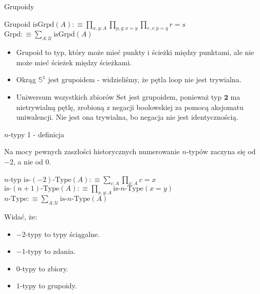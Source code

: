 \documentclass{beamer}
\newcommand{\defn}{:\equiv}
\newcommand{\U}{\mathcal{U}}
\newcommand{\isGrpd}{\text{isGrpd}}
\newcommand{\Set}{\text{Set}}
\newcommand{\Grpd}{\text{Grpd}}
\newcommand{\hS}{\mathbb{S}^1}
\newcommand{\looop}{\text{loop}}
\begin{document}
\begin{frame}{Grupoidy}

\begin{block}{Grupoid}
$\isGrpd(A) \defn \prod_{x, y : A} \prod_{p, q : x = y} \prod_{r, s : p = q} r = s$ \\
$\Grpd \defn \sum_{A : \U} \isGrpd(A)$
\end{block}

\begin{itemize}
	\item Grupoid to typ, który może mieć punkty i ścieżki między punktami, ale nie może mieć ścieżek między ścieżkami.
	\item Okrąg $\hS$ jest grupoidem - widzieliśmy, że pętla $\looop$ nie jest trywialna.
	\item Uniwersum wszystkich zbiorów $\Set$ jest grupoidem, ponieważ typ $\textbf{2}$ ma nietrywialną pętlę, zrobioną z negacji boolowskiej za pomocą aksjomatu uniwalencji. Nie jest ona trywialna, bo negacja nie jest identycznością.
\end{itemize}

\end{frame}

\begin{frame}{$n$-typy 1 - definicja}

Na mocy pewnych zaszłości historycznych numerowanie $n$-typów zaczyna się od $-2$, a nie od $0$.

\begin{block}{$n$-typ}
$\text{is-}(-2)\text{-Type}(A) \defn \sum_{c : A} \prod_{x : A} c = x$ \\
$\text{is-}(n + 1)\text{-Type}(A) \defn \prod_{x, y : A} \text{is-}n\text{-Type}(x = y)$ \\
$n\text{-Type} \defn \sum_{A : \U} \text{is-}n\text{-Type}(A)$
\end{block}

Widać, że:
\begin{itemize}
	\item $-2$-typy to typy ściągalne.
	\item $-1$-typy to zdania.
	\item $0$-typy to zbiory.
	\item $1$-typy to grupoidy.
\end{itemize}

\end{frame}
\end{document}
